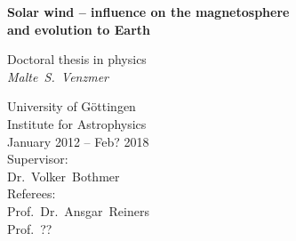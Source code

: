 
\begin{titlepage}
	\begin{center}
	
	
		\vspace*{10mm}
		\Large

		\textbf{Solar wind -- influence on the magnetosphere\\and evolution to Earth} 
		
		\vspace{15mm}
		\large
		Doctoral thesis in physics\\
		\vspace{15mm}
		\textit{Malte~S.~Venzmer}\\
		\vspace{10mm}
		
		
		\vspace{10mm}

		University of Göttingen\\
		\vspace{5mm}
		Institute for Astrophysics\\
		\vspace{5mm}
		January 2012 -- Feb? 2018\\
		\vspace{15mm}
		Supervisor:\\
		Dr.~Volker~Bothmer\\
		\vspace{5mm}
		Referees:\\
		Prof.~Dr.~Ansgar~Reiners\\
		Prof.~??\\
		
		
	\end{center}
\end{titlepage}

